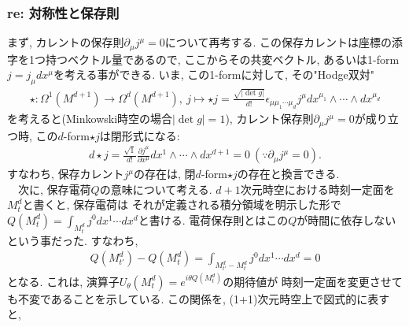\documentclass{ltjsarticle}
\theoremstyle{mystyle} %
\numberwithin{equation}{section}
\begin{document}
\subsubsection{re: 対称性と保存則}
まず, カレントの保存則$\partial_\mu j^{\mu}=0$について再考する. 
この保存カレントは座標の添字を1つ持つベクトル量であるので, ここからその共変ベクトル, あるいは1-form 
$j=j_\mu dx^\mu$を考える事ができる. 
いま, この1-formに対して, その"Hodge双対"
\begin{align}
    \star: \Omega^{1}(M^{d+1})\to \Omega^{d}(M^{d+1}), ~j\mapsto \star j = \frac{\sqrt{|\det{g}|}}{d!}\epsilon_{\mu \mu_1\cdots \mu_d}j^{\mu}dx^{\mu_1}\wedge \cdots \wedge dx^{\mu_d}
\end{align}
を考えると(Minkowski時空の場合$|\det{g}|=1$), 
カレント保存則$\partial_\mu j^\mu=0$が成り立つ時, この$d$-form$\star j$は閉形式になる: 
\begin{align}
    d\star j = \frac{\sqrt{1}}{d!}\frac{\partial j^\mu}{\partial x^\mu}dx^{1}\wedge \cdots \wedge dx^{d+1}=0~
    (\because \partial_\mu j^\mu = 0). 
\end{align}
すなわち, 保存カレント$j^\mu$の存在は, 閉$d$-form$\star j$の存在と換言できる. \\
　次に, 保存電荷$Q$の意味について考える. 
$d+1$次元時空における時刻一定面を$M^{d}_t$と書くと, 保存電荷は
それが定義される積分領域を明示した形で
$Q(M^d_t)=\int_{M^d_t} j^{0}dx^{1}\cdots dx^{d}$と書ける. 
電荷保存則とはこの$Q$が時間に依存しないという事だった. すなわち, 
\begin{align}
    Q(M^d_{t'})-Q(M^d_t)
    =\int_{M^d_{t'}-M^d_t} j^{0}dx^{1}\cdots dx^{d} =0
\end{align}
となる. これは, 演算子$U_{\theta}(M^d_t)=e^{i\theta Q(M^d_t)}$の期待値が
時刻一定面を変更させても不変であることを示している. 
この関係を, (1+1)次元時空上で図式的に表すと, \\
\end{document}
